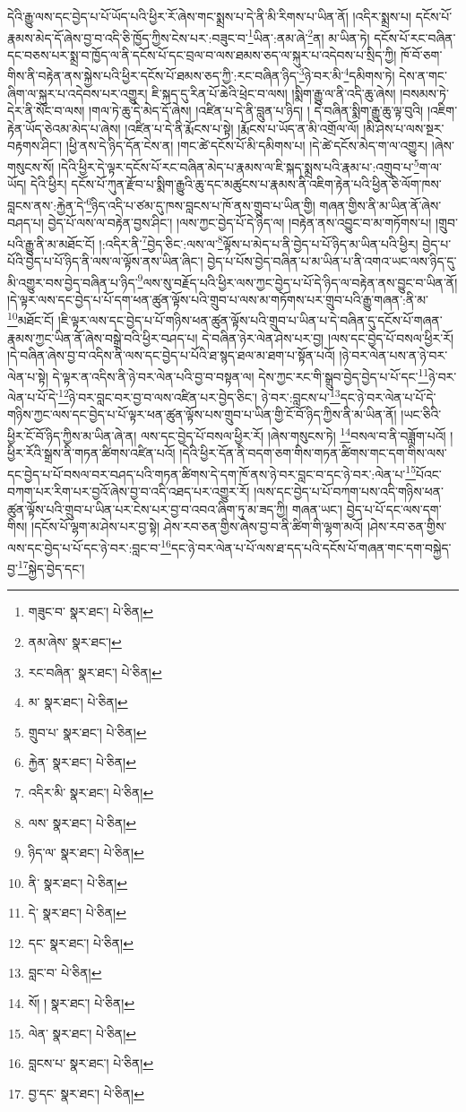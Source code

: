 དེའི་རྒྱུ་ལས་དང་བྱེད་པ་པོ་ཡོད་པའི་ཕྱིར་རོ་ཞེས་གང་སྨྲས་པ་དེ་ནི་མི་རིགས་པ་ཡིན་ནོ། །འདིར་སྨྲས་པ། དངོས་པོ་རྣམས་མེད་དོ་ཞེས་བྱ་བ་འདི་ཅི་ཁྱོད་ཀྱིས་ངེས་པར་:བཟུང་བ་\footnote{གཟུང་བ་  སྣར་ཐང་།  པེ་ཅིན། }ཡིན་:ནམ་ཞེ་\footnote{ནམ་ཞེས་  སྣར་ཐང་། }ན། མ་ཡིན་ཏེ། དངོས་པོ་རང་བཞིན་དང་བཅས་པར་སྨྲ་བ་ཁྱོད་ལ་ནི་དངོས་པོ་དང་བྲལ་བ་ལས་ཐམས་ཅད་ལ་སྐུར་པ་འདེབས་པ་སྲིད་ཀྱི། ཁོ་བོ་ཅག་གིས་ནི་བརྟེན་ནས་སྐྱེས་པའི་ཕྱིར་དངོས་པོ་ཐམས་ཅད་ཀྱི་:རང་བཞིན་ཉིད་\footnote{རང་བཞིན་  སྣར་ཐང་།  པེ་ཅིན། }ཉེ་བར་མི་\footnote{མ་  སྣར་ཐང་།  པེ་ཅིན། }དམིགས་ཏེ། དེས་ན་གང་ཞིག་ལ་སྐུར་པ་འདེབས་པར་འགྱུར། ཇི་སྐད་དུ་རིན་པོ་ཆེའི་ཕྲེང་བ་ལས། །སྨིག་རྒྱུ་ལ་ནི་འདི་ཆུ་ཞེས། །བསམས་ཏེ་དེར་ནི་སོང་བ་ལས། །གལ་ཏེ་ཆུ་དེ་མེད་དོ་ཞེས། །འཛིན་པ་དེ་ནི་བླུན་པ་ཉིད། །
དེ་བཞིན་སྨིག་རྒྱུ་ཆུ་ལྟ་བུའི། །འཇིག་རྟེན་ཡོད་ཅེའམ་མེད་པ་ཞེས། །འཛིན་པ་དེ་ནི་རྨོངས་པ་སྟེ། །རྨོངས་པ་ཡོད་ན་མི་འགྲོལ་ལོ། །མི་ཤེས་པ་ལས་སྔར་བརྟགས་ཤིང་། །ཕྱི་ནས་དེ་ཉིད་དོན་ངེས་ན། །གང་ཚེ་དངོས་པོ་མི་དམིགས་པ། །དེ་ཚེ་དངོས་མེད་ག་ལ་འགྱུར། །ཞེས་གསུངས་སོ། །དེའི་ཕྱིར་དེ་ལྟར་དངོས་པོ་རང་བཞིན་མེད་པ་རྣམས་ལ་ཇི་སྐད་སྨྲས་པའི་རྣམ་པ་:འགྲུབ་པ་\footnote{གྲུབ་པ་  སྣར་ཐང་།  པེ་ཅིན། }ག་ལ་ཡོད། དེའི་ཕྱིར། དངོས་པོ་ཀུན་རྫོབ་པ་སྨིག་རྒྱུའི་ཆུ་དང་མཚུངས་པ་རྣམས་ནི་འཇིག་རྟེན་པའི་ཕྱིན་ཅི་ལོག་ཁས་བླངས་ནས་:རྐྱེན་དེ་\footnote{རྐྱེན་  སྣར་ཐང་།  པེ་ཅིན། }ཉིད་འདི་པ་ཙམ་དུ་ཁས་བླངས་པ་ཁོ་ནས་གྲུབ་པ་ཡིན་གྱི། གཞན་གྱིས་ནི་མ་ཡིན་ནོ་ཞེས་བཤད་པ། བྱེད་པོ་ལས་ལ་བརྟེན་བྱས་ཤིང་། །ལས་ཀྱང་བྱེད་པོ་དེ་ཉིད་ལ། །བརྟེན་ནས་འབྱུང་བ་མ་གཏོགས་པ། །གྲུབ་པའི་རྒྱུ་ནི་མ་མཐོང་ངོ། །:འདིར་ནི་\footnote{འདིར་མི་  སྣར་ཐང་།  པེ་ཅིན། }བྱེད་ཅིང་:ལས་ལ་\footnote{ལས་  སྣར་ཐང་།  པེ་ཅིན། }ལྟོས་པ་མེད་པ་ནི་བྱེད་པ་པོ་ཉིད་མ་ཡིན་པའི་ཕྱིར། བྱེད་པ་པོའི་བྱེད་པ་པོ་ཉིད་ནི་ལས་ལ་ལྟོས་ནས་ཡིན་ཞིང་། བྱེད་པ་པོས་བྱེད་བཞིན་པ་མ་ཡིན་པ་ནི་འགའ་ཡང་ལས་ཉིད་དུ་མི་འགྱུར་བས་བྱེད་བཞིན་པ་ཉིད་\footnote{ཉིད་ལ་  སྣར་ཐང་།  པེ་ཅིན། }ལས་སུ་བརྗོད་པའི་ཕྱིར་ལས་ཀྱང་བྱེད་པ་པོ་དེ་ཉིད་ལ་བརྟེན་ནས་བྱུང་བ་ཡིན་ནོ། །དེ་ལྟར་ལས་དང་བྱེད་པ་པོ་དག་ཕན་ཚུན་ལྟོས་པའི་གྲུབ་པ་ལས་མ་གཏོགས་པར་གྲུབ་པའི་རྒྱུ་གཞན་:ནི་མ་\footnote{ནི་  སྣར་ཐང་།  པེ་ཅིན། }མཐོང་ངོ། །ཇི་ལྟར་ལས་དང་བྱེད་པ་པོ་གཉིས་ཕན་ཚུན་ལྟོས་པའི་གྲུབ་པ་ཡིན་པ་དེ་བཞིན་དུ་དངོས་པོ་གཞན་རྣམས་ཀྱང་ཡིན་ནོ་ཞེས་བསྒྲེ་བའི་ཕྱིར་བཤད་པ། དེ་བཞིན་ཉེར་ལེན་ཤེས་པར་བྱ། །ལས་དང་བྱེད་པོ་བསལ་ཕྱིར་རོ། །དེ་བཞིན་ཞེས་བྱ་བ་འདིས་ནི་ལས་དང་བྱེད་པ་པོའི་ཐ་སྙད་ཐལ་མ་ཐག་པ་སྟོན་པའོ། །ཉེ་བར་ལེན་པས་ན་ཉེ་བར་ལེན་པ་སྟེ། དེ་ལྟར་ན་འདིས་ནི་ཉེ་བར་ལེན་པའི་བྱ་བ་བསྟན་ལ། དེས་ཀྱང་རང་གི་སྒྲུབ་བྱེད་བྱེད་པ་པོ་དང་\footnote{དེ་  སྣར་ཐང་།  པེ་ཅིན། }ཉེ་བར་ལེན་པ་པོ་དེ་\footnote{དང་  སྣར་ཐང་།  པེ་ཅིན། }ཉེ་བར་བླང་བར་བྱ་བ་ལས་འཛིན་པར་བྱེད་ཅིང་། ཉེ་བར་:བླངས་པ་\footnote{བླང་བ་  པེ་ཅིན། }དང་ཉེ་བར་ལེན་པ་པོ་དེ་གཉིས་ཀྱང་ལས་དང་བྱེད་པ་པོ་ལྟར་ཕན་ཚུན་ལྟོས་པས་གྲུབ་པ་ཡིན་གྱི་ངོ་བོ་ཉིད་ཀྱིས་ནི་མ་ཡིན་ནོ། །ཡང་ཅིའི་ཕྱིར་ངོ་བོ་ཉིད་ཀྱིས་མ་ཡིན་ཞེ་ན། ལས་དང་བྱེད་པོ་བསལ་ཕྱིར་རོ། །ཞེས་གསུངས་ཏེ། \footnote{སོ། །   སྣར་ཐང་།  པེ་ཅིན། }བསལ་བ་ནི་བཟློག་པའོ། །ཕྱིར་རོའི་སྒྲས་ནི་གཏན་ཚིགས་འཛིན་པའོ། །དེའི་ཕྱིར་དོན་ནི་བདག་ཅག་གིས་གཏན་ཚིགས་གང་དག་གིས་ལས་དང་བྱེད་པ་པོ་བསལ་བར་བཤད་པའི་གཏན་ཚིགས་དེ་དག་ཁོ་ནས་ཉེ་བར་བླང་བ་དང་ཉེ་བར་:ལེན་པ་\footnote{ལེན་  སྣར་ཐང་།  པེ་ཅིན། }པོའང་བཀག་པར་རིག་པར་བྱའོ་ཞེས་བྱ་བ་འདི་འཐད་པར་འགྱུར་རོ། །ལས་དང་བྱེད་པ་པོ་བཀག་པས་འདི་གཉིས་ཕན་ཚུན་ལྟོས་པའི་གྲུབ་པ་ཡིན་པར་ངེས་པར་བྱ་བ་འབའ་ཞིག་ཏུ་མ་ཟད་ཀྱི། གཞན་ཡང་། བྱེད་པ་པོ་དང་ལས་དག་གིས། །དངོས་པོ་ལྷག་མ་ཤེས་པར་བྱ་སྟེ། ཤེས་རབ་ཅན་གྱིས་ཞེས་བྱ་བ་ནི་ཚིག་གི་ལྷག་མའོ། །ཤེས་རབ་ཅན་གྱིས་ལས་དང་བྱེད་པ་པོ་དང་ཉེ་བར་:བླང་བ་\footnote{བླངས་པ་  སྣར་ཐང་།  པེ་ཅིན། }དང་ཉེ་བར་ལེན་པ་པོ་ལས་ཐ་དད་པའི་དངོས་པོ་གཞན་གང་དག་བསྐྱེད་བྱ་\footnote{བྱ་དང་  སྣར་ཐང་།  པེ་ཅིན། }སྐྱེད་བྱེད་དང་། 